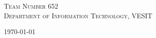 \documentclass{article}
\begin{document}
\begin{titlepage}
    \vfill\vfill\vfill
    \textsc{\Large Team Number 652}\\[0.5cm] %
	
	\textsc{\Large Department of Information Technology, VESIT}\\[0.5cm] 
	
	
	
	
	\vfill\vfill\vfill %
	
	{\large\today} %
	
	
	 
	
	\vfill %
	
\end{titlepage}



\pagebreak
\large\tableofcontents
\pagebreak

\end{document}
